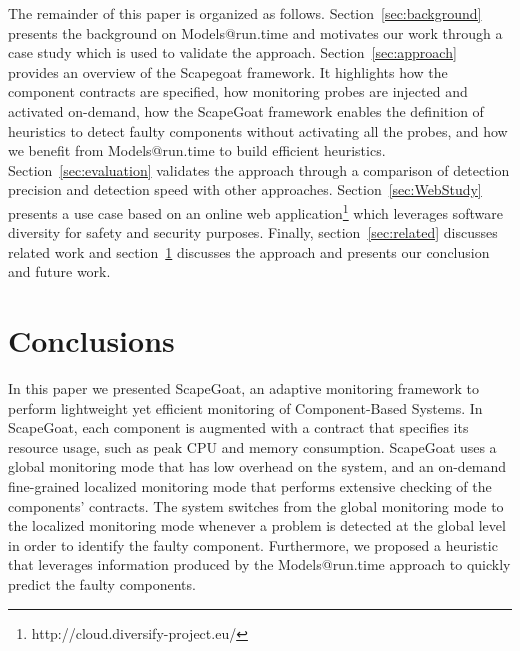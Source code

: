 The remainder of this paper is organized as follows.
Section~\ref{sec:background} presents the background on Models@run.time and motivates our work through a case study which is used to validate the approach.
Section~\ref{sec:approach} provides an overview of the Scapegoat framework.
It highlights how the component contracts are specified, how monitoring probes are injected and activated on-demand, how the ScapeGoat framework enables the definition of heuristics to detect faulty components without activating all the probes, and how we benefit from Models@run.time to build efficient heuristics.
Section~\ref{sec:evaluation} validates the approach through a comparison of detection precision and detection speed with other approaches.
Section~\ref{sec:WebStudy} presents a use case based on an online web application\footnote{http://cloud.diversify-project.eu/} which leverages software diversity for safety and security purposes.
Finally, section~\ref{sec:related} discusses related work and section~\ref{sec:conclusion} discusses the approach and presents our conclusion and future work.




%

\section{Conclusions}\label{sec:conclusion}
In this paper we presented ScapeGoat, an adaptive monitoring framework to perform lightweight yet efficient monitoring of Component-Based Systems.
In ScapeGoat, each component is augmented with a contract that specifies its resource usage, such as peak CPU and memory consumption.
ScapeGoat uses a global monitoring mode that has low overhead on the system, and an on-demand fine-grained localized monitoring mode that performs extensive checking of the components' contracts.
The system switches from the global monitoring mode to the localized monitoring mode whenever a problem is detected at the global level in order to identify the faulty component.
Furthermore, we proposed a heuristic that leverages information produced by the Models@run.time approach to quickly predict the faulty components. 

